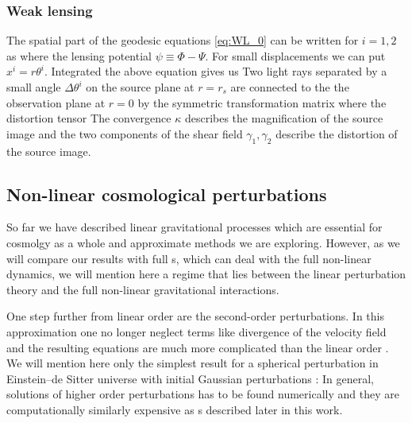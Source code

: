 \subsubsection{Weak lensing}
The spatial part of the geodesic equations \eqref{eq:WL_0} can be written for $i=1,2$ as
where the lensing potential $\psi\equiv\Phi-\Psi$. For small displacements we can put $x^i=r\theta^i$. Integrated the above equation gives us
Two light rays separated by a small angle  $\Delta\theta^i$ on the source plane at $r=r_s$ are connected to the the observation plane at $r=0$ by the symmetric transformation matrix
where the distortion tensor
The convergence $\kappa$ describes the magnification of the source image and the two components of the shear field $\gamma_1,\gamma_2$ describe the distortion of the source image.
\subsection{Non-linear cosmological perturbations}
So far we have described linear gravitational processes which are essential for cosmolgy as a whole and approximate methods we are exploring. However, as we will compare our results with full \nbodysim s, which can deal with the full non-linear dynamics, we will mention here a regime that lies between the linear perturbation theory and the full non-linear gravitational interactions.

One step further from linear order are the second-order perturbations. In this approximation one no longer neglect terms like divergence of the velocity field and the resulting equations are much more complicated than the linear order \textcite[see e.g.][]{2004astro.ph.12025T,10.1093/mnras/264.2.375,2010deto.book.....A}. We will mention here only the simplest result for a spherical perturbation in Einstein--de Sitter universe with initial Gaussian perturbations \textcite{1980_Peebles}:
In general, solutions of higher order perturbations has to be found numerically and they are computationally similarly expensive as \nbodysim s described later in this work.

